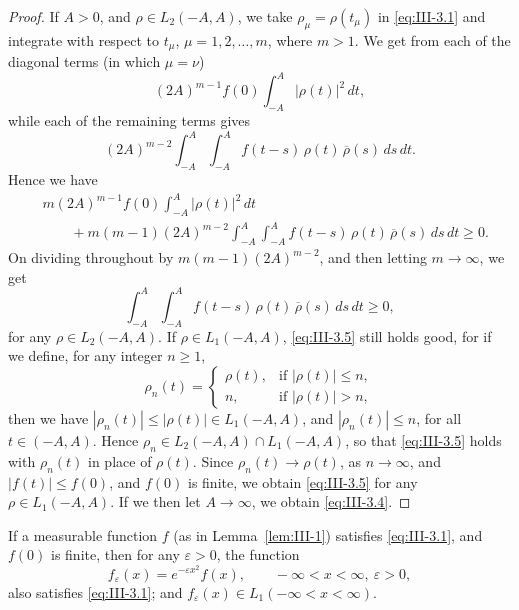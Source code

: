 \begin{proof}
If $A>0$, and $\rho\in L_{2}(-A,A)$, we take $\rho_{\mu}=\rho(t_{\mu})$ in \eqref{eq:III-3.1} and integrate with respect to $t_{\mu}$, $\mu=1,2,\dots,m$, where $m>1$. We get from each of the diagonal terms (in which $\mu=\nu$)
\[
(2A)^{m-1}f(0)\int_{-A}^{A}|\rho(t)|^{2}\,dt,
\]
while each of the remaining terms gives
\[
(2A)^{m-2}\int_{-A}^{A}\int_{-A}^{A}f(t-s)\,\rho(t)\,\overline{\rho}(s)\,ds\,dt.
\]
Hence we have
\[
\begin{aligned}
&m(2A)^{m-1}f(0)\int_{-A}^{A}|\rho(t)|^{2}\,dt\\
&\qquad+m(m-1)(2A)^{m-2}\int_{-A}^{A}\int_{-A}^{A}f(t-s)\,\rho(t)\,\overline{\rho}(s)\,ds\,dt\ge0.
\end{aligned}
\]
On dividing throughout by $m(m-1)(2A)^{m-2}$, and then letting $m\to\infty$, we get
\begin{equation}\tag{3.5}\label{eq:III-3.5}
\int_{-A}^{A}\int_{-A}^{A}f(t-s)\,\rho(t)\,\overline{\rho}(s)\,ds\,dt\ge0,
\end{equation}
for any $\rho\in L_{2}(-A,A)$. If $\rho\in L_{1}(-A,A)$, \eqref{eq:III-3.5} still holds good, for if we define, for any integer $n\ge1$,
\[
\rho_{n}(t)=
\begin{cases}
\rho(t),&\text{if }|\rho(t)|\le n,\\
n,&\text{if }|\rho(t)|>n,
\end{cases}
\]
then we have $|\rho_{n}(t)|\le|\rho(t)|\in L_{1}(-A,A)$, and $|\rho_{n}(t)|\le n$, for all $t\in(-A,A)$. Hence $\rho_{n}\in L_{2}(-A,A)\cap L_{1}(-A,A)$, so that \eqref{eq:III-3.5} holds with $\rho_{n}(t)$ in place of $\rho(t)$. Since $\rho_{n}(t)\to\rho(t)$, as $n\to\infty$, and $|f(t)|\le f(0)$, and $f(0)$ is finite, we obtain \eqref{eq:III-3.5} for any $\rho\in L_{1}(-A,A)$. If we then let $A\to\infty$, we obtain \eqref{eq:III-3.4}.
\end{proof}

\begin{lemma}\label{lem:III-3}
If a measurable function $f$ (as in Lemma~\ref{lem:III-1}) satisfies \eqref{eq:III-3.1}, and $f(0)$ is finite, then for any $\varepsilon>0$, the function
\begin{equation}\tag{3.6}\label{eq:III-3.6}
f_{\varepsilon}(x)=e^{-\varepsilon x^{2}}f(x),\qquad-\infty<x<\infty,\ \varepsilon>0,
\end{equation}
also satisfies \eqref{eq:III-3.1}; and $f_{\varepsilon}(x)\in L_{1}(-\infty<x<\infty)$.
\end{lemma}

